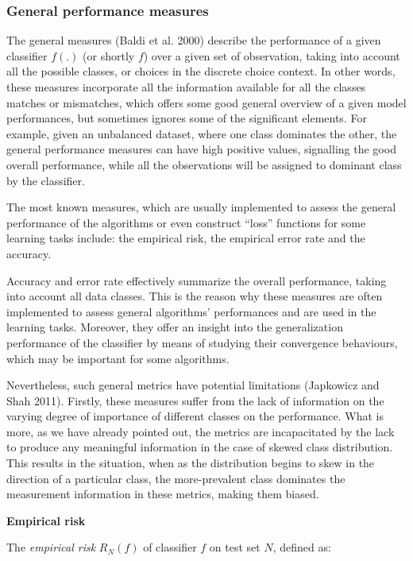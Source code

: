 \documentclass[11pt,]{article}
\begin{document}
\hypertarget{general-performance-measures}{%
\subsubsection{General performance
measures}\label{general-performance-measures}}

The general measures (Baldi et al. 2000) describe the performance of a
given classifier \(f(.)\) (or shortly \(f\)) over a given set of
observation, taking into account all the possible classes, or choices in
the discrete choice context. In other words, these measures incorporate
all the information available for all the classes matches or mismatches,
which offers some good general overview of a given model performances,
but sometimes ignores some of the significant elements. For example,
given an unbalanced dataset, where one class dominates the other, the
general performance measures can have high positive values, signalling
the good overall performance, while all the observations will be
assigned to dominant class by the classifier.

The most known measures, which are usually implemented to assess the
general performance of the algorithms or even construct ``loss''
functions for some learning tasks include: the empirical risk, the
empirical error rate and the accuracy.

Accuracy and error rate effectively summarize the overall performance,
taking into account all data classes. This is the reason why these
measures are often implemented to assess general algorithms'
performances and are used in the learning tasks. Moreover, they offer an
insight into the generalization performance of the classifier by means
of studying their convergence behaviours, which may be important for
some algorithms.

Nevertheless, such general metrics have potential limitations (Japkowicz
and Shah 2011). Firstly, these measures suffer from the lack of
information on the varying degree of importance of different classes on
the performance. What is more, as we have already pointed out, the
metrics are incapacitated by the lack to produce any meaningful
information in the case of skewed class distribution. This results in
the situation, when as the distribution begins to skew in the direction
of a particular class, the more-prevalent class dominates the
measurement information in these metrics, making them biased.

\textbf{Empirical risk}

The \emph{empirical risk} \(R_{N} (f)\) of classifier \(f\) on test set
\(N\), defined as:
\end{document}
